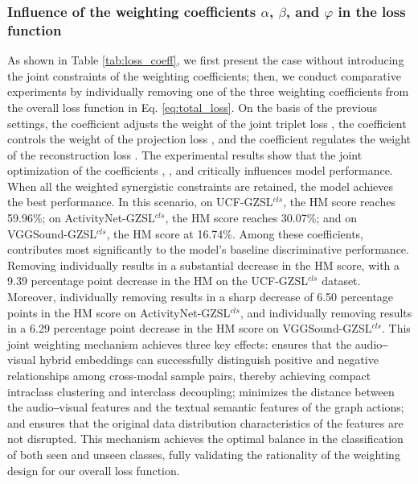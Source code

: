 \documentclass[lettersize,journal]{IEEEtran}
\begin{document}
\subsubsection{Influence of the weighting coefficients $\alpha$, $\beta$, and $\varphi$ in the loss function}
As shown in Table \ref{tab:loss_coeff}, we first present the case without introducing the joint constraints of the weighting coefficients; then, we conduct comparative experiments by individually removing one of the three weighting coefficients from the overall loss function in Eq. \eqref{eq:total_loss}. On the basis of the previous settings, the coefficient  adjusts the weight of the joint triplet loss , the coefficient  controls the weight of the projection loss , and the coefficient  regulates the weight of the reconstruction loss . The experimental results show that the joint optimization of the coefficients , , and  critically influences model performance. When all the weighted synergistic constraints are retained, the model achieves the best performance. In this scenario, on UCF-GZSL$^{\textit{cls}}$, the HM score reaches 59.96\%; on ActivityNet-GZSL$^{\textit{cls}}$, the HM score reaches 30.07\%; and on VGGSound-GZSL$^{\textit{cls}}$, the HM score at 16.74\%. Among these coefficients,  contributes most significantly to the model's baseline discriminative performance. Removing  individually results in a substantial decrease in the HM score, with a 9.39 percentage point decrease in the HM on the UCF-GZSL$^{\textit{cls}}$ dataset. Moreover, individually removing  results in a sharp decrease of 6.50 percentage points in the HM score on ActivityNet-GZSL$^{\textit{cls}}$, and individually removing  results in a 6.29 percentage point decrease in the HM score on VGGSound-GZSL$^{\textit{cls}}$. This joint weighting mechanism achieves three key effects:  ensures that the audio‒visual hybrid embeddings can successfully distinguish positive and negative relationships among cross-modal sample pairs, thereby achieving compact intraclass clustering and interclass decoupling;  minimizes the distance between the audio‒visual features and the textual semantic features of the graph actions; and  ensures that the original data distribution characteristics of the features are not disrupted. This mechanism achieves the optimal balance in the classification of both seen and unseen classes, fully validating the rationality of the weighting design for our overall loss function.
\end{document}
